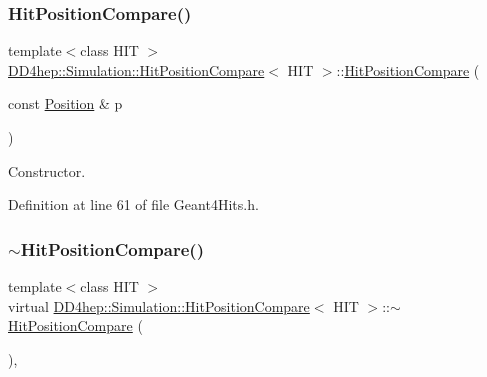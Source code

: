 \subsubsection{\texorpdfstring{Hit\+Position\+Compare()}{HitPositionCompare()}}
{\footnotesize\ttfamily template$<$class H\+IT $>$ \\
\hyperlink{struct_d_d4hep_1_1_simulation_1_1_hit_position_compare}{D\+D4hep\+::\+Simulation\+::\+Hit\+Position\+Compare}$<$ H\+IT $>$\+::\hyperlink{struct_d_d4hep_1_1_simulation_1_1_hit_position_compare}{Hit\+Position\+Compare} (\begin{DoxyParamCaption}\item[{const \hyperlink{namespace_d_d4hep_1_1_geometry_a55083902099d03506c6db01b80404900}{Position} \&}]{p }\end{DoxyParamCaption})\hspace{0.3cm}{\ttfamily [inline]}}



Constructor. 



Definition at line 61 of file Geant4\+Hits.\+h.

\hypertarget{struct_d_d4hep_1_1_simulation_1_1_hit_position_compare_a0fa91c4c8ba1e1e4db40ed13c16421e6}{}\label{struct_d_d4hep_1_1_simulation_1_1_hit_position_compare_a0fa91c4c8ba1e1e4db40ed13c16421e6} 
\subsubsection{\texorpdfstring{$\sim$\+Hit\+Position\+Compare()}{~HitPositionCompare()}}
{\footnotesize\ttfamily template$<$class H\+IT $>$ \\
virtual \hyperlink{struct_d_d4hep_1_1_simulation_1_1_hit_position_compare}{D\+D4hep\+::\+Simulation\+::\+Hit\+Position\+Compare}$<$ H\+IT $>$\+::$\sim$\hyperlink{struct_d_d4hep_1_1_simulation_1_1_hit_position_compare}{Hit\+Position\+Compare} (\begin{DoxyParamCaption}{ }\end{DoxyParamCaption})\hspace{0.3cm}{\ttfamily [inline]}, {\ttfamily [virtual]}}



